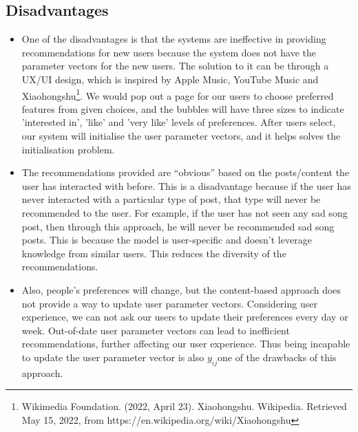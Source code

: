 \subsection*{Disadvantages}
\begin{itemize}
\item One of the disadvantages is that the systems are ineffective in providing recommendations for new users because the system does not have the parameter vectors for the new users. 
The solution to it can be through a UX/UI design, which is inspired by Apple Music, YouTube Music and Xiaohongshu\footnote{Wikimedia Foundation. (2022, April 23). Xiaohongshu. Wikipedia. Retrieved May 15, 2022, from https://en.wikipedia.org/wiki/Xiaohongshu }. We would pop out a page for our users to choose preferred features from given choices, and the bubbles will have three sizes to indicate 'interested in', 'like' and 'very like' levels of preferences. After users select, our system will initialise the user parameter vectors, and it helps solves the initialisation problem.%
\item The recommendations provided are “obvious” based on the posts/content the user has interacted with before. This is a disadvantage because if the user has never interacted with a particular type of post, that type will never be recommended to the user. 
For example, if the user has not seen any sad song post, then through this approach, he will never be recommended sad song posts. This is because the model is user-specific and doesn’t leverage knowledge from similar users. This reduces the diversity of the recommendations.
%
\item Also, people's preferences will change, but the content-based approach does not provide a way to update user parameter vectors. Considering user experience, we can not ask our users to update their preferences every day or week. Out-of-date user parameter vectors can lead to inefficient recommendations, further affecting our user experience. Thus being incapable to update the user parameter vector is also $y_{ij}$one of the drawbacks of this approach.
\end{itemize}



